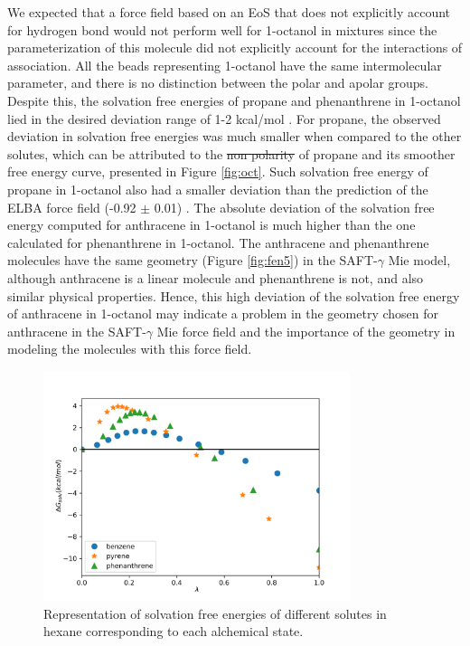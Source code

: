 \documentclass[
	12pt,				%
	openany,			%
	oneside,			%
	a4paper,			%
	english,			%
	brazil				%
	]{abntex2}
\providecommand{\DIFadd}[1]{{\protect\color{blue}\uwave{#1}}}
\providecommand{\DIFdel}[1]{{\protect\color{red}\sout{#1}}}
\providecommand{\DIFaddbegin}{}
\providecommand{\DIFaddend}{}
\providecommand{\DIFdelbegin}{}
\providecommand{\DIFdelend}{}
\providecommand{\DIFadd}[1]{{\protect\color{blue}\uwave{#1}}} %
\providecommand{\DIFdel}[1]{{\protect\color{red}\sout{#1}}}                      %
\providecommand{\DIFaddbegin}{} %
\providecommand{\DIFaddend}{} %
\providecommand{\DIFdelbegin}{} %
\providecommand{\DIFdelend}{} %
\begin{document}
We expected that a force field based on an EoS that does not explicitly account for hydrogen bond would not perform well for 1-octanol in mixtures since the parameterization of this molecule did not explicitly account for the interactions of association. All the beads representing 1-octanol have the same intermolecular parameter, and there is no distinction between the polar and apolar groups. Despite this, the solvation free energies of propane and phenanthrene in 1-octanol lied in the desired deviation range of 1-2 kcal/mol \cite{doimobley}. For propane, the observed deviation in solvation free energies was much smaller when compared to the other solutes, which can be attributed to the \DIFdelbegin \DIFdel{non polarity }\DIFdelend \DIFaddbegin \DIFadd{non-polarity }\DIFaddend of propane and its smoother free energy curve, presented in Figure \ref{fig:oct}. Such solvation free energy of propane in 1-octanol also had a smaller deviation than the prediction of the ELBA force field (-0.92 $\pm$ 0.01) \cite{doi:10.1021/acs.jctc.5b00963}. The absolute deviation of the solvation free energy computed for anthracene in 1-octanol is much higher than the one calculated for phenanthrene in 1-octanol. The anthracene and phenanthrene molecules have the same geometry (Figure \ref{fig:fen5}) in the SAFT-$\gamma$ Mie model, although anthracene is a linear molecule and phenanthrene is not, and also similar physical properties. Hence, this high deviation of the solvation free energy of anthracene in 1-octanol may indicate a problem in the geometry chosen for anthracene in the SAFT-$\gamma$ Mie force field and the importance of the geometry in modeling the molecules with this force field.      
\FloatBarrier
\begin{figure}[H]
	\centering
	\includegraphics[width=0.8\textwidth]{Figures/hex}
	\caption{Representation of solvation free energies of different solutes in hexane corresponding to each alchemical state.}
	\label{fig:hex}
\end{figure}
\end{document}
